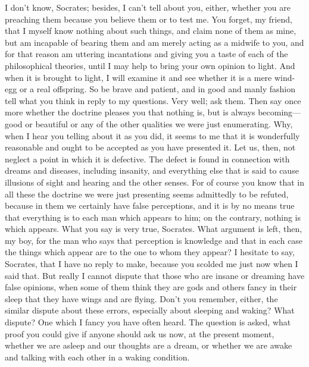 \documentclass[letterpaper,12pt]{article}
\newcommand{\stephpag}[1]{\marginnote{\small\itshape\fontfamily{ppl}\selectfont #1}}
\begin{document}
\begin{drama}
\theaetetusspeaks
I don't know, Socrates; besides, I can't tell about you, either, whether you are preaching them because you believe them or to test me.
\socratesspeaks
You forget, my friend, that I myself know nothing about such things, and claim none of them as mine, but am incapable of bearing them and am merely acting as a midwife to you, and for that reason am uttering incantations and giving you a taste of each of the philosophical theories, \stephpag{d} until I may help to bring your own opinion to light. And when it is brought to light, I will examine it and see whether it is a mere wind-egg or a real offspring. So be brave and patient, and in good and manly fashion tell what you think in reply to my questions.
\theaetetusspeaks
Very well; ask them.
\socratesspeaks
Then say once more whether the doctrine pleases you that nothing is, but is always becoming—good or beautiful or any of the other qualities we were just enumerating.
\theaetetusspeaks
Why, when I hear you telling about it as you did, it seems to me that it is wonderfully reasonable and ought to be accepted as you have presented it. \stephpag{e}
\socratesspeaks
Let us, then, not neglect a point in which it is defective. The defect is found in connection with dreams and diseases, including insanity, and everything else that is said to cause illusions of sight and hearing and the other senses. For of course you know that in all these the doctrine we were just presenting seems admittedly to be refuted, because \stephpag{158 a} in them we certainly have false perceptions, and it is by no means true that everything is to each man which appears to him; on the contrary, nothing is which appears.
\theaetetusspeaks
What you say is very true, Socrates.
\socratesspeaks
What argument is left, then, my boy, for the man who says that perception is knowledge and that in each case the things which appear are to the one to whom they appear?
\theaetetusspeaks
I hesitate to say, Socrates, that I have no reply to make, because you scolded me just now when I said that. \stephpag{b} But really I cannot dispute that those who are insane or dreaming have false opinions, when some of them think they are gods and others fancy in their sleep that they have wings and are flying.
\socratesspeaks
Don't you remember, either, the similar dispute about these errors, especially about sleeping and waking?
\theaetetusspeaks
What dispute?
\socratesspeaks
One which I fancy you have often heard. The question is asked, what proof you could give if anyone should ask us now, at the present moment, whether we are asleep and our thoughts are a dream, or whether we are awake \stephpag{c} and talking with each other in a waking condition.

\end{drama}
\end{document}
